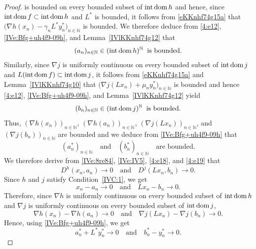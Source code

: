 \documentclass[a4paper,11pt,fleqn]{article}
\newcommand{\NN}{\ensuremath{\mathbb N}}
\newcommand{\dom}{\ensuremath{\text{\rm dom}\,}}
\newcommand{\inte}{\ensuremath{\text{\rm int}\,}}
\newcommand{\intdom}{\ensuremath{\text{\rm int\,dom}\,}}
\theoremstyle{plain}{\theorembodyfont{\rmfamily}%
\newtheorem{conjecture}[theorem]{Conjecture}}
\theoremstyle{plain}{\theorembodyfont{\rmfamily}%
\newtheorem{example}[theorem]{Example}}
\theoremstyle{plain}{\theorembodyfont{\rmfamily}%
\newtheorem{remark}[theorem]{Remark}}
\theoremstyle{plain}{\theorembodyfont{\rmfamily}%
\newtheorem{algorithm}[theorem]{Algorithm}}
\theoremstyle{plain}{\theorembodyfont{\rmfamily}%
\newtheorem{condition}[theorem]{Condition}}
\theoremstyle{plain}{\theorembodyfont{\rmfamily}%
\newtheorem{definition}[theorem]{Definition}}
\theoremstyle{plain}{\theorembodyfont{\rmfamily}
\newtheorem{problem}[theorem]{Problem}}
\theoremstyle{plain}{\theorembodyfont{\rmfamily}
\newtheorem{notation}[theorem]{Notation}}
\numberwithin{equation}{section}
\begin{document}
\begin{proof}
is bounded on every bounded subset of $\intdom h$ and hence, 
since $\inte\dom f\subset\inte\dom h$ and $L^*$ is bounded, 
it follows from \eqref{eKKnhf74g15a} that
$\big(\nabla h(x_n)-\gamma_nL^*y_n^*\big)_{n\in\NN}$ is bounded. 
We therefore deduce from \eqref{4:e12}, 
\eqref{IVe:Bfg+uh4f9-09h},
and Lemma~\ref{IVlKKnhf74g12} that
\begin{equation}
\label{4:e18}
(a_n)_{n\in\NN}\in(\intdom h)^{\NN}\;\;\text{is bounded}.
\end{equation}
Similarly, since $\nabla j$ is uniformly continuous on every 
bounded subset 
of $\intdom j$ and $L(\intdom f)\subset\intdom j$, it follows 
from \eqref{eKKnhf74g15a} and Lemma~\ref{IVlKKnhf74g10} 
that $\big(\nabla j(Lx_n)+\mu_ny_n^*\big)_{n\in\NN}$ is bounded 
and hence \eqref{4:e12}, \eqref{IVe:Bfg+uh4f9-09h},
and Lemma~\ref{IVlKKnhf74g12} yield
\begin{equation}
\label{4:e19}
(b_n)_{n\in\NN}\in(\intdom j)^{\NN}\;\;\text{is bounded}.
\end{equation} 
Thus, $(\nabla h(x_n))_{n\in\NN}$, $(\nabla h(a_n))_{n\in\NN}$,
$(\nabla j(Lx_n))_{n\in\NN}$, and $(\nabla j(b_n))_{n\in\NN}$ 
are bounded and we deduce from \eqref{IVe:Bfg+uh4f9-09h} that 
\begin{equation}
\label{eKKnhf74g15b}
(a^*_n)_{n\in\NN}\quad\text{and}\quad(b^*_n)_{n\in\NN}
\quad\text{are bounded}.
\end{equation}
We therefore derive from 
\eqref{IVe:8re84}, \eqref{IVe:IV5}, \eqref{4:e18}, and 
\eqref{4:e19} that
\begin{equation}
\label{eKKnhf74g15h}
D^h(x_n,a_n)\to 0\quad\text{and}\quad
D^j(Lx_n,b_n)\to 0.
\end{equation}
Since $h$ and $j$ satisfy Condition~\ref{IVC:1}, we get
\begin{equation}
\label{IVe:IV10}
x_n-a_n\to 0\quad\text{and}\quad Lx_n-b_n\to 0.
\end{equation}
Therefore, since $\nabla h$ is uniformly continuous on every 
bounded subset of $\intdom h$ and $\nabla j$ is uniformly 
continuous on every bounded subset of $\intdom j$,
\begin{equation}
\label{IVe:IV12a}
\nabla h(x_n)-\nabla h(a_n)\to 0\quad\text{and}\quad
\nabla j(Lx_n)-\nabla j(b_n)\to 0.
\end{equation}
Hence, using \eqref{IVe:Bfg+uh4f9-09h}, we get
\begin{equation}
\label{IVe:IV13}
a_n^*+L^*y_n^*\to 0
\quad\text{and}\quad 
b_n^*-y_n^*\to 0.
\end{equation}

\end{proof}
\end{document}
